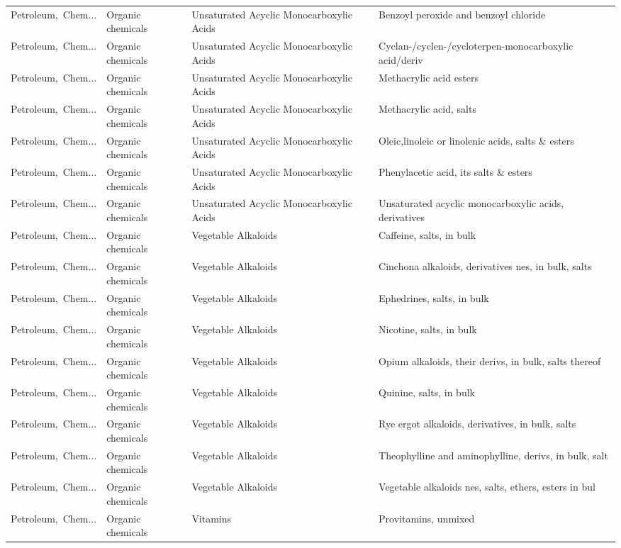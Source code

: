 \begin{appendices}
\begin{xltabular}{\textwidth}{|p{0.10\textwidth}|p{0.25\textwidth}|p{0.24\textwidth}|p{0.31\textwidth}|}
Petroleum,\ Chem... & Organic chemicals & Unsaturated Acyclic Monocarboxylic Acids & Benzoyl peroxide and benzoyl chloride \\
Petroleum,\ Chem... & Organic chemicals & Unsaturated Acyclic Monocarboxylic Acids & Cyclan-/cyclen-/cycloterpen-monocarboxylic acid/deriv \\
Petroleum,\ Chem... & Organic chemicals & Unsaturated Acyclic Monocarboxylic Acids & Methacrylic acid esters \\
Petroleum,\ Chem... & Organic chemicals & Unsaturated Acyclic Monocarboxylic Acids & Methacrylic acid, salts \\
Petroleum,\ Chem... & Organic chemicals & Unsaturated Acyclic Monocarboxylic Acids & Oleic,linoleic or linolenic acids, salts \& esters \\
Petroleum,\ Chem... & Organic chemicals & Unsaturated Acyclic Monocarboxylic Acids & Phenylacetic acid, its salts \& esters \\
Petroleum,\ Chem... & Organic chemicals & Unsaturated Acyclic Monocarboxylic Acids & Unsaturated acyclic monocarboxylic acids, derivatives \\
Petroleum,\ Chem... & Organic chemicals & Vegetable Alkaloids & Caffeine, salts, in bulk \\
Petroleum,\ Chem... & Organic chemicals & Vegetable Alkaloids & Cinchona alkaloids, derivatives nes, in bulk, salts \\
Petroleum,\ Chem... & Organic chemicals & Vegetable Alkaloids & Ephedrines, salts, in bulk \\
Petroleum,\ Chem... & Organic chemicals & Vegetable Alkaloids & Nicotine, salts, in bulk \\
Petroleum,\ Chem... & Organic chemicals & Vegetable Alkaloids & Opium alkaloids, their derivs, in bulk, salts thereof \\
Petroleum,\ Chem... & Organic chemicals & Vegetable Alkaloids & Quinine, salts, in bulk \\
Petroleum,\ Chem... & Organic chemicals & Vegetable Alkaloids & Rye ergot alkaloids, derivatives, in bulk, salts \\
Petroleum,\ Chem... & Organic chemicals & Vegetable Alkaloids & Theophylline and aminophylline, derivs, in bulk, salt \\
Petroleum,\ Chem... & Organic chemicals & Vegetable Alkaloids & Vegetable alkaloids nes, salts, ethers, esters in bul \\
Petroleum,\ Chem... & Organic chemicals & Vitamins & Provitamins, unmixed \\

\end{xltabular}
\end{appendices}
